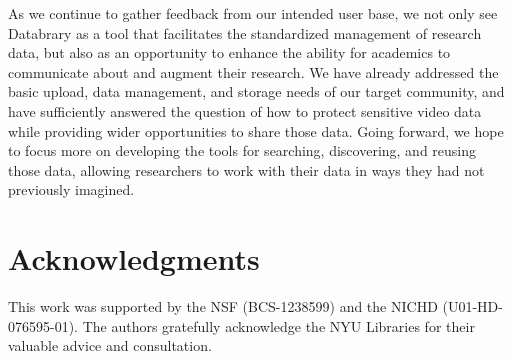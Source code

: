 \documentclass{sig-alternate}
\begin{document}
As we continue to gather feedback from our intended user base, we not only see Databrary as a tool that facilitates the standardized management of research data, but also as an opportunity to enhance the ability for academics to communicate about and augment their research.
We have already addressed the basic upload, data management, and storage needs of our target community, and have sufficiently answered the question of how to protect sensitive video data while providing wider opportunities to share those data.
Going forward, we hope to focus more on developing the tools for searching, discovering, and reusing those data, allowing researchers to work with their data in ways they had not previously imagined.

\section*{Acknowledgments}

This work was supported by the NSF (BCS-1238599) and the NICHD (U01-HD-076595-01).
The authors gratefully acknowledge the NYU Libraries for their valuable advice and consultation.
\end{document}
